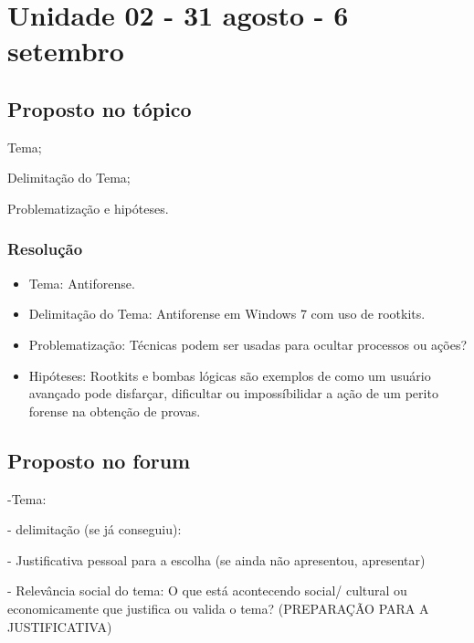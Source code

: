 

\chapter{Unidade 02 - 31 agosto - 6 setembro}

\section{Proposto no tópico}

Tema;

Delimitação do Tema;

Problematização e hipóteses.

\subsection{Resolução}


\begin{itemize}
  \item Tema: Antiforense.
  \item Delimitação do Tema: Antiforense em Windows 7 com uso de rootkits.
  \item Problematização: Técnicas podem ser usadas para ocultar processos ou ações? 
  \item  Hipóteses: Rootkits e bombas lógicas são exemplos de como um usuário avançado pode disfarçar, dificultar ou impossíbilidar a ação de um perito forense na obtenção de provas.
\end{itemize}

\section{Proposto no forum}

-Tema: 

- delimitação (se já conseguiu):

- Justificativa pessoal para a escolha (se ainda não apresentou, apresentar)

- Relevância social  do tema: O que está acontecendo social/ cultural ou economicamente que justifica ou valida o tema? (PREPARAÇÃO PARA A JUSTIFICATIVA)

